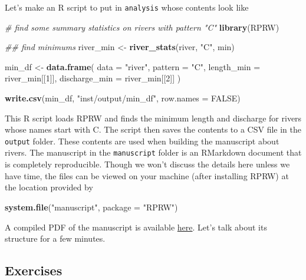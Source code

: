 \documentclass[
]{book}
\newenvironment{Shaded}{\begin{snugshade}}{\end{snugshade}}
\newcommand{\CommentTok}[1]{\textcolor[rgb]{0.56,0.35,0.01}{\textit{#1}}}
\newcommand{\DataTypeTok}[1]{\textcolor[rgb]{0.13,0.29,0.53}{#1}}
\newcommand{\DecValTok}[1]{\textcolor[rgb]{0.00,0.00,0.81}{#1}}
\newcommand{\KeywordTok}[1]{\textcolor[rgb]{0.13,0.29,0.53}{\textbf{#1}}}
\newcommand{\NormalTok}[1]{#1}
\newcommand{\OtherTok}[1]{\textcolor[rgb]{0.56,0.35,0.01}{#1}}
\newcommand{\StringTok}[1]{\textcolor[rgb]{0.31,0.60,0.02}{#1}}
\begin{document}
Let's make an R script to put in \texttt{analysis} whose contents look like

\begin{Shaded}
\begin{Highlighting}[]
\CommentTok{# find some summary statistics on rivers with pattern "C"}
\KeywordTok{library}\NormalTok{(RPRW)}

\CommentTok{## find minimums}
\NormalTok{river_min <-}\StringTok{ }\KeywordTok{river_stats}\NormalTok{(river, }\StringTok{"C"}\NormalTok{, min)}

\NormalTok{min_df <-}\StringTok{ }\KeywordTok{data.frame}\NormalTok{(}
  \DataTypeTok{data =} \StringTok{"river"}\NormalTok{,}
  \DataTypeTok{pattern =} \StringTok{"C"}\NormalTok{,}
  \DataTypeTok{length_min =}\NormalTok{ river_min[[}\DecValTok{1}\NormalTok{]],}
  \DataTypeTok{discharge_min =}\NormalTok{ river_min[[}\DecValTok{2}\NormalTok{]]}
\NormalTok{)}

\KeywordTok{write.csv}\NormalTok{(min_df, }\StringTok{"inst/output/min_df"}\NormalTok{, }\DataTypeTok{row.names =} \OtherTok{FALSE}\NormalTok{)}
\end{Highlighting}
\end{Shaded}

This R script loads RPRW and finds the minimum length and discharge for rivers whose names start with C. The script then saves the contents to a CSV file in the \texttt{output} folder. These contents are used when building the manuscript about rivers. The manuscript in the \texttt{manuscript} folder is an RMarkdown document that is completely reproducible. Though we won't discuss the details here unless we have time, the files can be viewed on your machine (after installing RPRW) at the location provided by

\begin{Shaded}
\begin{Highlighting}[]
\KeywordTok{system.file}\NormalTok{(}\StringTok{"manuscript"}\NormalTok{, }\DataTypeTok{package =} \StringTok{"RPRW"}\NormalTok{)}
\end{Highlighting}
\end{Shaded}

A compiled PDF of the manuscript is available \href{https://github.com/michaeldumelle/RPRW/blob/main/inst/manuscript/manuscript.pdf}{here}. Let's talk about its structure for a few minutes.

\hypertarget{exercises-7}{%
\subsection{Exercises}\label{exercises-7}}
\end{document}

